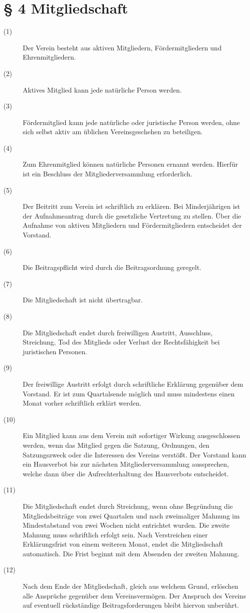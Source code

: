 \documentclass[a4paper,12pt]{scrartcl}
\begin{document}
\section*{\S{} 4 Mitgliedschaft}
\begin{description} 

\item[(1)] Der Verein besteht aus aktiven Mitgliedern, Fördermitgliedern und Ehrenmitgliedern.
\item[(2)] Aktives Mitglied kann jede natürliche Person werden.
\item[(3)] Fördermitglied kann jede natürliche oder juristische Person werden, ohne sich selbst aktiv am üblichen Vereinsgeschehen zu beteiligen.
\item[(4)] Zum Ehrenmitglied können natürliche Personen ernannt werden. Hierfür ist ein Beschluss der Mitgliederversammlung erforderlich.
\item[(5)] Der Beitritt zum Verein ist schriftlich zu erklären. Bei Minderjährigen ist der Aufnahmeantrag durch die gesetzliche Vertretung zu stellen. Über die Aufnahme von aktiven Mitgliedern und Fördermitgliedern entscheidet der Vorstand.
\item[(6)] Die Beitragspflicht wird durch die Beitragsordnung geregelt.
\item[(7)] Die Mitgliedschaft ist nicht übertragbar. 
\item[(8)] Die Mitgliedschaft endet durch freiwilligen Austritt, Ausschluss, Streichung, Tod des Mitglieds oder Verlust der Rechtsfähigkeit bei juristischen Personen.
\item[(9)] Der freiwillige Austritt erfolgt durch schriftliche Erklärung gegenüber dem Vorstand. Er ist zum Quartalsende möglich und muss mindestens einen Monat vorher schriftlich erklärt werden.
\item[(10)] Ein Mitglied kann aus dem Verein mit sofortiger Wirkung ausgeschlossen werden, wenn das Mitglied gegen die Satzung, Ordnungen, den Satzungszweck oder die Interessen des Vereins verstößt. Der Vorstand kann ein Hausverbot bis zur nächsten Mitgliederversammlung aussprechen, welche dann über die Aufrechterhaltung des Hausverbots entscheidet.
\item[(11)] Die Mitgliedschaft endet durch Streichung, wenn ohne Begründung die Mitgliedsbeiträge von zwei Quartalen und nach zweimaliger Mahnung im Mindestabstand von zwei Wochen nicht entrichtet wurden. Die zweite Mahnung muss schriftlich erfolgt sein. Nach Verstreichen einer Erklärungsfrist von einem weiteren Monat, endet die Mitgliedschaft automatisch. Die Frist beginnt mit dem Absenden der zweiten Mahnung. 
\item[(12)] Nach dem Ende der Mitgliedschaft, gleich aus welchem Grund, erlöschen alle Ansprüche gegenüber dem Vereinsvermögen. Der Anspruch des Vereins auf eventuell rückständige Beitragsforderungen bleibt hiervon unberührt.

\end{description}
\end{document}
